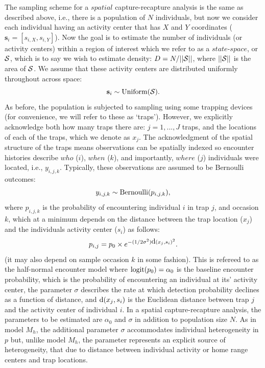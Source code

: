 \documentclass{book}
\begin{document}
The sampling scheme for a $spatial$ capture-recapture analysis is the
same as described above, i.e., there is a population of $N$
individuals, but now we consider each individual having an activity
center that has $X$ and $Y$ coordinates
($\textbf{s}_i=[s_{i,X},s_{i,Y}]$). Now the goal is to estimate the
number of individuals (or activity centers) within a region of
interest which we refer to as a $state$-$space$, or ${\cal S}$, which
is to say we wish to estimate density: $D = N/||{\cal S}||$, where
$||{\cal S}||$ is the area of ${\cal S}$. We assume that these
activity centers are distributed uniformly throughout across space:
\[
\textbf{s}_i \sim \hbox{Uniform}({\cal S}).
\]
As before, the population is subjected to sampling using some trapping
devices (for convenience, we will refer to these as `traps'). However,
we explicitly acknowledge both how many traps there are: $j=1,...,J$
traps, and the locations of each of the traps, which we denote as
$x_j$.  The acknowledgment of the spatial structure of the traps
means observations can be spatially indexed so encounter histories
describe $who$ ($i$), $when$ ($k$), and importantly, $where$ ($j$)
individuals were located, i.e., $y_{i,j,k}$. Typically, these
observations are assumed to be Bernoulli outcomes:
\[
y_{i,j,k} \sim \hbox{Bernoulli}(p_{i,j,k}),
\]
where $p_{i,j,k}$ is the probability of encountering individual $i$ in
trap $j$, and occasion $k$, which at a minimum depends on the distance between the trap location
($x_j$) and the individuals activity center ($s_i$) as follows:
\begin{equation}
p_{i,j} = p_0 \times e^{-(1/2\sigma^2) \hbox{d}(x_{j},s_{i})^{2}}.
\end{equation}
(it may also depend on sample occasion $k$ in some fashion).
This is refereed to as the half-normal  encounter
model where $\hbox{logit}(p_0) = \alpha_0$ is the baseline encounter
probability, which is the probability of encountering an individual at
its' activity center, the parameter $\sigma$ describes the rate at
which detection probability declines as a function of distance, and
$\hbox{d}(x_{j},s_{i})$ is the Euclidean distance between trap $j$ and
the activity center of individual $i$. In a spatial capture-recapture
analysis, the parameters to be estimated are $\alpha_0$ and $\sigma$
in addition to population size $N$.  As in model $M_h$, the additional
parameter $\sigma$ accommodates individual heterogeneity in $p$ but,
unlike model $M_h$, the parameter represents an explicit source of
heterogeneity, that due to distance between individual activity or
home range centers and trap locations.
\end{document}
